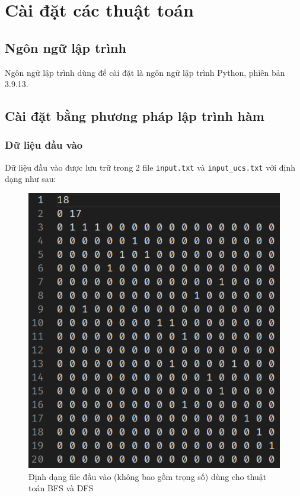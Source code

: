 \documentclass[a4paper, 11pt]{article}
\begin{document}
\section{Cài đặt các thuật toán}

\subsection{Ngôn ngữ lập trình}
Ngôn ngữ lập trình dùng để cài đặt là ngôn ngữ lập trình Python, phiên bản 3.9.13.

\subsection{Cài đặt bằng phương pháp lập trình hàm}

\subsubsection{Dữ liệu đầu vào}
Dữ liệu đầu vào được lưu trữ trong 2 file \lstinline{input.txt} và \lstinline{input_ucs.txt} với định dạng như sau:

\begin{figure}[h]
    \centering
    \includegraphics[]{input.png}
    \caption{Định dạng file đầu vào (không bao gồm trọng số) dùng cho thuật toán BFS và DFS}
\end{figure}
\end{document}
